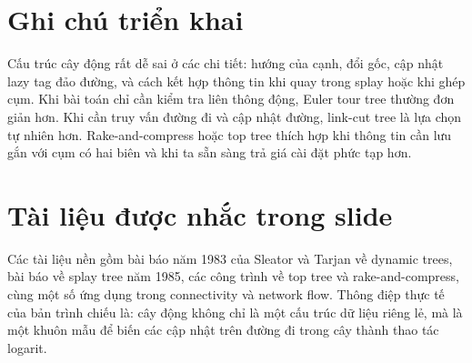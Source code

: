 \documentclass[11pt]{article}
\begin{document}
\section{Ghi chú triển khai}

Cấu trúc cây động rất dễ sai ở các chi tiết: hướng của cạnh, đổi gốc, cập
nhật lazy tag đảo đường, và cách kết hợp thông tin khi quay trong splay hoặc
khi ghép cụm. Khi bài toán chỉ cần kiểm tra liên thông động, Euler tour tree
thường đơn giản hơn. Khi cần truy vấn đường đi và cập nhật đường, link-cut
tree là lựa chọn tự nhiên hơn. Rake-and-compress hoặc top tree thích hợp khi
thông tin cần lưu gắn với cụm có hai biên và khi ta sẵn sàng trả giá cài đặt
phức tạp hơn.

\section{Tài liệu được nhắc trong slide}

Các tài liệu nền gồm bài báo năm 1983 của Sleator và Tarjan về dynamic trees,
bài báo về splay tree năm 1985, các công trình về top tree và rake-and-compress,
cùng một số ứng dụng trong connectivity và network flow. Thông điệp thực tế
của bản trình chiếu là: cây động không chỉ là một cấu trúc dữ liệu riêng lẻ,
mà là một khuôn mẫu để biến các cập nhật trên đường đi trong cây thành thao
tác logarit.
\end{document}
